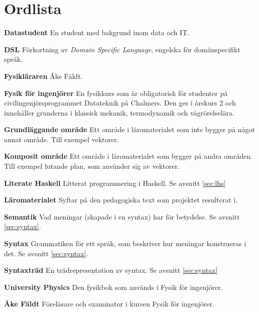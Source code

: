 
\chapter*{Ordlista}

\textbf{Datastudent} En student med bakgrund inom data och IT.

\textbf{DSL} Förkortning av \textit{Domain Specific Language}, engelska för domänspecifikt språk.

\textbf{Fysikläraren} Åke Fäldt.

\textbf{Fysik för ingenjörer} En fysikkurs som är obligatorisk för studenter på civilingenjörsprogrammet Datateknik på Chalmers. Den ges i årskurs 2 och innehåller grunderna i klassisk mekanik, termodynamik och vågrörelselära.

\textbf{Grundläggande område} Ett område i läromaterialet som inte bygger på något annat område. Till exempel vektorer.

\textbf{Komposit område} Ett område i läromaterialet som bygger på andra områden. Till exempel lutande plan, som använder sig av vektorer.

\textbf{Literate Haskell} Litterat programmering i Haskell. Se avsnitt \ref{sec:lhs}

\textbf{Läromaterialet} Syftar på den pedagogiska text som projektet resulterat i.

\textbf{Semantik} Vad meningar (skapade i en syntax) har för betydelse. Se avsnitt \ref{sec:syntax}.

\textbf{Syntax} Grammatiken för ett språk, som beskriver hur meningar konstrueras i det. Se avsnitt \ref{sec:syntax}.

\textbf{Syntaxträd} En trädrepresentation av syntax. Se avsnitt \ref{sec:syntax}

\textbf{University Physics} Den fysikbok som används i Fysik för ingenjörer.

\textbf{Åke Fäldt} Föreläsare och examinator i kursen Fysik för ingenjörer.
